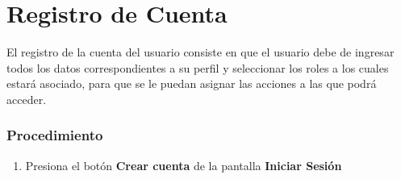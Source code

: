 
\section{Registro de Cuenta}
El registro de la cuenta del usuario consiste en que el usuario debe de ingresar todos los datos correspondientes a su perfil y seleccionar los roles a los cuales estará asociado, para que se le puedan asignar las acciones a las que podrá acceder.

\subsubsection{Procedimiento}
\begin{enumerate}
	
	\item Presiona el botón \textbf{Crear cuenta} de la pantalla \textbf{Iniciar Sesión}
	

\end{enumerate}
